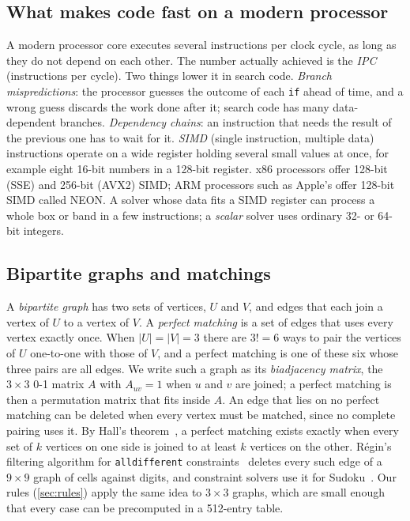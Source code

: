 \documentclass[11pt]{article}
\theoremstyle{definition}
\theoremstyle{plain}
\begin{document}
\subsection{What makes code fast on a modern processor}

A modern processor core executes several instructions per clock cycle, as long as they do not depend on each other.
The number actually achieved is the \emph{IPC} (instructions per cycle). Two things lower it in search code.
\emph{Branch mispredictions}: the processor guesses the outcome of each \texttt{if} ahead of time, and a wrong guess
discards the work done after it; search code has many data-dependent branches. \emph{Dependency chains}: an
instruction that needs the result of the previous one has to wait for it. \emph{SIMD} (single instruction, multiple
data) instructions operate on a wide register holding several small values at once, for example eight 16-bit numbers
in a 128-bit register. x86 processors offer 128-bit (SSE) and 256-bit (AVX2) SIMD; ARM processors such as Apple's
offer 128-bit SIMD called NEON. A solver whose data fits a SIMD register can process a whole box or band in a few
instructions; a \emph{scalar} solver uses ordinary 32- or 64-bit integers.

\subsection{Bipartite graphs and matchings}

A \emph{bipartite graph} has two sets of vertices, $U$ and $V$, and edges that each join a vertex of $U$ to a vertex
of $V$. A \emph{perfect matching} is a set of edges that uses every vertex exactly once. When $|U|=|V|=3$ there are
$3!=6$ ways to pair the vertices of $U$ one-to-one with those of $V$, and a perfect matching is one of these six whose
three pairs are all edges. We write such a graph as its \emph{biadjacency matrix}, the $3\times 3$ 0-1 matrix $A$ with
$A_{uv}=1$ when $u$ and $v$ are joined; a perfect matching is then a permutation matrix that fits inside $A$. An edge
that lies on no perfect matching can be deleted when every vertex must be matched, since no complete pairing uses it.
By Hall's theorem~\cite{hall1935representatives}, a perfect matching exists exactly when every set of $k$ vertices on
one side is joined to at least $k$ vertices on the other. R\'egin's filtering algorithm for \texttt{alldifferent}
constraints~\cite{regin1994filtering} deletes every such edge of a $9\times 9$ graph of cells against digits, and
constraint solvers use it for Sudoku~\cite{simonis2005sudoku}. Our rules (\cref{sec:rules}) apply the same idea to
$3\times 3$ graphs, which are small enough that every case can be precomputed in a 512-entry table.
\end{document}
